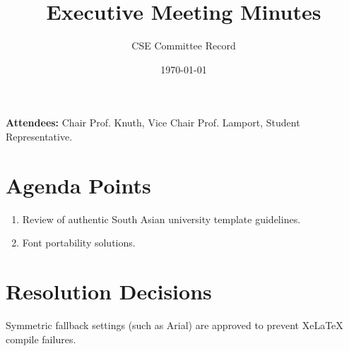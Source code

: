\documentclass[11pt,a4paper]{article}
\title{\bfseries Executive Meeting Minutes}
\author{CSE Committee Record}
\date{\today}
\begin{document}
\maketitle

\noindent
\textbf{Attendees:} Chair Prof. Knuth, Vice Chair Prof. Lamport, Student Representative.

\section{Agenda Points}
\begin{enumerate}
    \item Review of authentic South Asian university template guidelines.
    \item Font portability solutions.
\end{enumerate}

\section{Resolution Decisions}
Symmetric fallback settings (such as Arial) are approved to prevent XeLaTeX compile failures.
\end{document}
